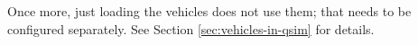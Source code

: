Once more, just loading the vehicles does not use them; that needs to be configured separately.  See Section \ref{sec:vehicles-in-qsim} for details.










